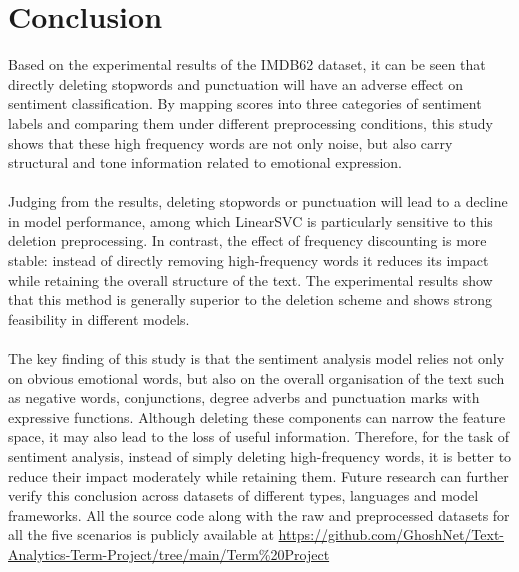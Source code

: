 \documentclass[a4paper,10pt]{article}
\begin{document}
\section{Conclusion}
Based on the experimental results of the IMDB62 dataset, it can be seen that directly deleting stopwords and punctuation will have an adverse effect on sentiment classification. By mapping scores into three categories of sentiment labels and comparing them under different preprocessing conditions, this study shows that these high frequency words are not only noise, but also carry structural and tone information related to emotional expression.\\\\
Judging from the results, deleting stopwords or punctuation will lead to a decline in model performance, among which LinearSVC is particularly sensitive to this deletion preprocessing. In contrast, the effect of frequency discounting is more stable: instead of directly removing high-frequency words it reduces its impact while retaining the overall structure of the text. The experimental results show that this method is generally superior to the deletion scheme and shows strong feasibility in different models.\\\\
The key finding of this study is that the sentiment analysis model relies not only on obvious emotional words, but also on the overall organisation of the text such as negative words, conjunctions, degree adverbs and punctuation marks with expressive functions. Although deleting these components can narrow the feature space, it may also lead to the loss of useful information. Therefore, for the task of sentiment analysis, instead of simply deleting high-frequency words, it is better to reduce their impact moderately while retaining them. Future research can further verify this conclusion across datasets of different types, languages and model frameworks. All the source code along with the raw and preprocessed datasets for all the five scenarios is publicly available at \url{https://github.com/GhoshNet/Text-Analytics-Term-Project/tree/main/Term%20Project}









\newpage

\newpage

\newpage

\end{document}
